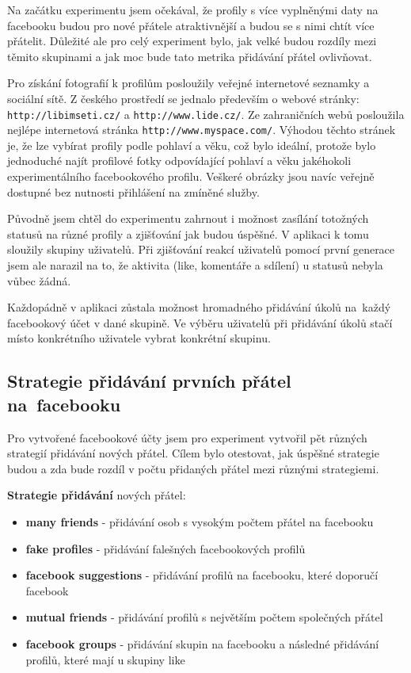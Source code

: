 \documentclass[thesis=M,czech]{FITthesis}[2013/05/10]
\begin{document}
Na začátku experimentu jsem očekával, že profily s více vyplněnými daty na facebooku budou pro nové přátele atraktivnější a budou se s nimi chtít více přátelit. Důležité ale pro celý experiment bylo, jak velké budou rozdíly mezi těmito skupinami a jak moc bude tato metrika přidávání přátel ovlivňovat.

Pro získání fotografií k profilům posloužily veřejné internetové seznamky a sociální sítě. Z českého prostředí se jednalo především o webové stránky: \verb|http://libimseti.cz/| a \verb|http://www.lide.cz/|. Ze zahraničních webů posloužila nejlépe internetová stránka \verb|http://www.myspace.com/|. Výhodou těchto stránek je, že lze vybírat profily podle pohlaví a věku, což bylo ideální, protože bylo jednoduché najít profilové fotky odpovídající pohlaví a věku jakéhokoli experimentálního facebookového profilu. Veškeré obrázky jsou navíc veřejně dostupné bez nutnosti přihlášení na zmíněné služby.

Původně jsem chtěl do experimentu zahrnout i možnost zasílání totožných statusů na různé profily a zjišťování jak budou úspěšné. V aplikaci k tomu sloužily skupiny uživatelů. Při zjišťování reakcí uživatelů pomocí první generace jsem ale narazil na to, že aktivita (like, komentáře a sdílení) u statusů nebyla vůbec žádná. 

Každopádně v aplikaci zůstala možnost hromadného přidávání úkolů na~každý facebookový účet v dané skupině. Ve výběru uživatelů při přidávání úkolů stačí místo konkrétního uživatele vybrat konkrétní skupinu.

\subsection{Strategie přidávání prvních přátel na~facebooku}

Pro vytvořené facebookové účty jsem pro experiment vytvořil pět různých strategií přidávání nových přátel. Cílem bylo otestovat, jak úspěšné strategie budou a zda bude rozdíl v počtu přidaných přátel mezi různými strategiemi. 

\textbf{Strategie přidávání} nových přátel:

\begin{itemize}
  \item \textbf{many friends} - přidávání osob s vysokým počtem přátel na facebooku
  \item \textbf{fake profiles} - přidávání falešných facebookových profilů
  \item \textbf{facebook suggestions} - přidávání profilů na facebooku, které doporučí facebook 
  \item \textbf{mutual friends} - přidávání profilů s největším počtem společných přátel
  \item \textbf{facebook groups} - přidávání skupin na facebooku a následné přidávání profilů, které mají u skupiny like
\end{itemize}
\end{document}
